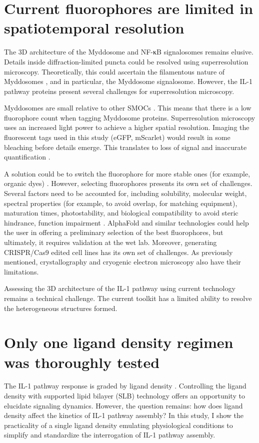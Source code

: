 \section{Current fluorophores are limited in spatiotemporal resolution}
The 3D architecture of the Myddosome and NF-κB signalosomes remains elusive. Details inside diffraction-limited puncta could be resolved using superresolution microscopy. Theoretically, this could ascertain the filamentous nature of Myddosomes \autocite{Moncrieffe_2020}, and in particular, the Myddosome signalosome. However, the IL-1 pathway proteins present several challenges for superresolution microscopy.

Myddosomes are small relative to other SMOCs \autocite{Kagan_2014}\autocite{Lin_2010}. This means that there is a low fluorophore count when tagging Myddosome proteins. Superresolution microscopy uses an increased light power to achieve a higher spatial resolution. Imaging the fluorescent tags used in this study (eGFP, mScarlet) would result in some bleaching before details emerge. This translates to loss of signal and inaccurate quantification \autocite{Thorley_2014}.

A solution could be to switch the fluorophore for more stable ones (for example, organic dyes) \autocite{Grimm_2017}. However, selecting fluorophores presents its own set of challenges. Several factors need to be accounted for, including solubility, molecular weight, spectral properties (for example, to avoid overlap, for matching equipment), maturation times, photostability, and biological compatibility to avoid steric hindrance, function impairment \autocite{Verkhusha_2004}\autocite{Zheng_2014}. AlphaFold and similar technologies could help the user in offering a preliminary selection of the best fluorophores, but ultimately, it requires validation at the wet lab. Moreover, generating CRISPR/Cas9 edited cell lines has its own set of challenges. As previously mentioned, crystallography and cryogenic electron microscopy also have their limitations.

Assessing the 3D architecture of the IL-1 pathway using current technology remains a technical challenge. The current toolkit has a limited ability to resolve the heterogeneous structures formed.

\section{Only one ligand density regimen was thoroughly tested}
The IL-1 pathway response is graded by ligand density \autocite{Latty_2018}\autocite{DeFelice_2019}. Controlling the ligand density with supported lipid bilayer (SLB) technology offers an opportunity to elucidate signaling dynamics. However, the question remains: how does ligand density affect the kinetics of IL-1 pathway assembly? In this study, I show the practicality of a single ligand density emulating physiological conditions to simplify and standardize the interrogation of IL-1 pathway assembly.

